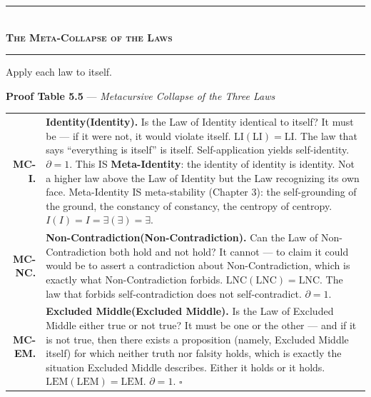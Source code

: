 \documentclass[10pt, openany, oneside]{book}
\renewcommand{\normalsize}{\fontsize{10}{13}\selectfont}
\renewcommand{\footnotesize}{\fontsize{8.5}{11}\selectfont}
\begin{document}
\begin{center}
    \rule{0.3\textwidth}{0.4pt}\\[0.5em]
    {\normalsize\bfseries\scshape The Meta-Collapse of the Laws}\\[0.3em]
    \rule{0.3\textwidth}{0.4pt}
\end{center}

\vspace{1em}

\noindent Apply each law to itself.

\textbf{Proof Table 5.5} --- \textit{Metacursive Collapse of the Three Laws}

\vspace{0.5em}

{\footnotesize
\noindent\begin{tabular}{r p{}}
\textbf{MC-I.} & \textbf{Identity(Identity).} Is the Law of Identity identical to itself? It must be --- if it were not, it would violate itself. $\text{LI}(\text{LI}) = \text{LI}$. The law that says ``everything is itself'' is itself. Self-application yields self-identity. $\partial = 1$. This IS \textbf{Meta-Identity}: the identity of identity is identity. Not a higher law above the Law of Identity but the Law recognizing its own face. Meta-Identity IS meta-stability (Chapter 3): the self-grounding of the ground, the constancy of constancy, the centropy of centropy. $I(I) = I = \exists(\exists) = \exists$. \\[0.3em]
\textbf{MC-NC.} & \textbf{Non-Contradiction(Non-Contradiction).} Can the Law of Non-Contradiction both hold and not hold? It cannot --- to claim it could would be to assert a contradiction about Non-Contradiction, which is exactly what Non-Contradiction forbids. $\text{LNC}(\text{LNC}) = \text{LNC}$. The law that forbids self-contradiction does not self-contradict. $\partial = 1$. \\[0.3em]
\textbf{MC-EM.} & \textbf{Excluded Middle(Excluded Middle).} Is the Law of Excluded Middle either true or not true? It must be one or the other --- and if it is not true, then there exists a proposition (namely, Excluded Middle itself) for which neither truth nor falsity holds, which is exactly the situation Excluded Middle describes. Either it holds or it holds. $\text{LEM}(\text{LEM}) = \text{LEM}$. $\partial = 1$. $\square$ \\[0.3em]
\end{tabular}
}

\vspace{0.8em}
\end{document}
